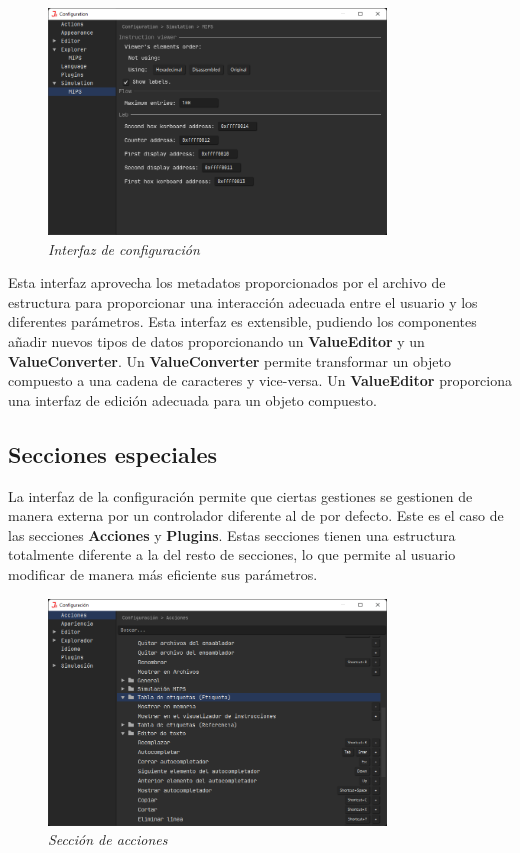 \begin{figure}[H]
    \centering
    \includegraphics[width=0.8\textwidth]{images/base/jams-config}
    \caption{\textit{Interfaz de configuración}}
    \label{fig:jams-configuracion}
\end{figure}

\noindent Esta interfaz aprovecha los metadatos proporcionados por el archivo
de estructura para proporcionar una interacción adecuada entre el usuario
y los diferentes parámetros.
Esta interfaz es extensible, pudiendo los componentes añadir nuevos tipos de datos
proporcionando un \textbf{ValueEditor} y un \textbf{ValueConverter}.
Un \textbf{ValueConverter} permite transformar un objeto compuesto a una cadena
de caracteres y vice-versa.
Un \textbf{ValueEditor} proporciona una interfaz de edición adecuada para un
objeto compuesto.

\subsection{Secciones especiales}\label{subsec:secciones-especiales}

La interfaz de la configuración permite que ciertas gestiones se
gestionen de manera externa por un controlador diferente al de
por defecto.
Este es el caso de las secciones \textbf{Acciones} y \textbf{Plugins}.
Estas secciones tienen una estructura totalmente diferente a la
del resto de secciones, lo que permite al usuario modificar
de manera más eficiente sus parámetros.

\begin{figure}[H]
    \centering
    \includegraphics[width=0.8\textwidth]{images/base/jams-config-actions}
    \caption{\textit{Sección de acciones}}
    \label{fig:jams-configuracion-acciones}
\end{figure}

